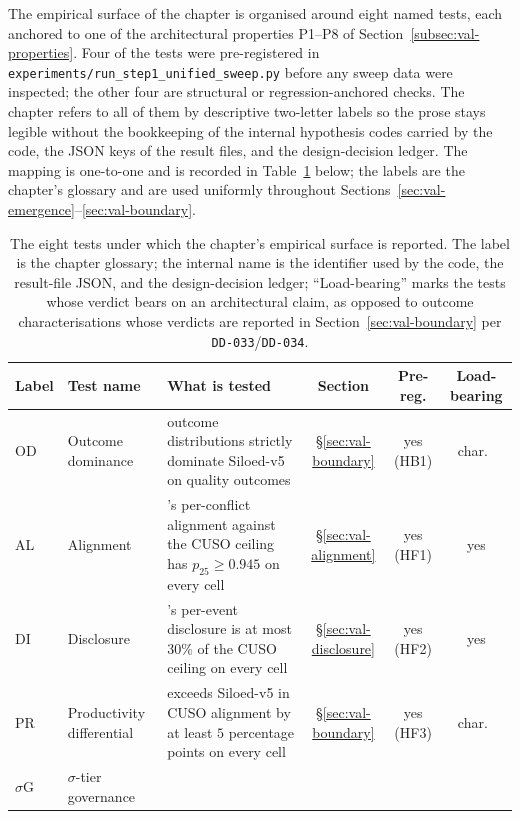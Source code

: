 The empirical surface of the chapter is organised around eight
named tests, each anchored to one of the architectural properties
P1--P8 of Section~\ref{subsec:val-properties}. Four of the tests
were pre-registered in
\texttt{experiments/run\_step1\_unified\_sweep.py} before any sweep
data were inspected; the other four are structural or
regression-anchored checks. The chapter refers to all of them by
descriptive two-letter labels so the prose stays legible without
the bookkeeping of the internal hypothesis codes carried by the
code, the JSON keys of the result files, and the design-decision
ledger. The mapping is one-to-one and is recorded in
Table~\ref{tab:val-tests} below; the labels are the chapter's
glossary and are used uniformly throughout
Sections~\ref{sec:val-emergence}--\ref{sec:val-boundary}.

\begin{table}[ht]
\centering
\caption{The eight tests under which the chapter's empirical surface
is reported. The label is the chapter glossary; the internal name is
the identifier used by the code, the result-file JSON, and the
design-decision ledger; ``Load-bearing'' marks the tests whose
verdict bears on an architectural claim, as opposed to outcome
characterisations whose verdicts are reported in
Section~\ref{sec:val-boundary} per \texttt{DD-033}/\texttt{DD-034}.}
\label{tab:val-tests}
\small
\begin{tabularx}{\textwidth}{@{}l l X c c c@{}}
\toprule
\textbf{Label} & \textbf{Test name} & \textbf{What is tested}
  & \textbf{Section} & \textbf{Pre-reg.} & \textbf{Load-bearing} \\
\midrule
OD   & Outcome dominance
     & \NEXUS{} outcome distributions strictly dominate Siloed-v5 on
       quality outcomes
     & \S\ref{sec:val-boundary}
     & yes (HB1)
     & char.\ \\
AL   & Alignment
     & \NEXUS{}'s per-conflict alignment against the CUSO ceiling has
       $p_{25} \ge 0.945$ on every cell
     & \S\ref{sec:val-alignment}
     & yes (HF1)
     & yes \\
DI   & Disclosure
     & \NEXUS{}'s per-event disclosure is at most $30\%$ of the
       CUSO ceiling on every cell
     & \S\ref{sec:val-disclosure}
     & yes (HF2)
     & yes \\
PR   & Productivity differential
     & \NEXUS{} exceeds Siloed-v5 in CUSO alignment by at least
       $5$ percentage points on every cell
     & \S\ref{sec:val-boundary}
     & yes (HF3)
     & char.\ \\
$\sigma$G & $\sigma$-tier governance

\end{tabularx}
\end{table}
